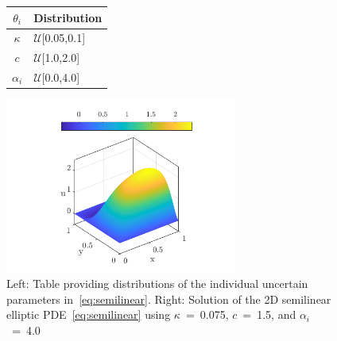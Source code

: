 \begin{figure}[htbp]
\begin{center}
\begin{minipage}[htbp]{.25\linewidth}
\vspace{0pt}
\hspace{-25mm}
\begin{tabular}{cl}
\toprule
$\theta_i$ & \textbf{Distribution} \\ 
\bottomrule
$\kappa$ & $\mathcal{U}$[0.05,0.1] \\
$c$ & $\mathcal{U}$[1.0,2.0] \\
$\alpha_i$ & $\mathcal{U}$[0.0,4.0] \\
\bottomrule
\end{tabular}
\end{minipage}
\hspace{-20mm}
\begin{minipage}[htbp]{.25\linewidth}
\vspace{0pt}
\includegraphics[width=3.0in]{./Figures/u_soln.png}
\end{minipage}%
\end{center} 
\caption{Left: Table providing distributions of the individual
uncertain parameters in~\eqref{eq:semilinear}. Right: Solution
of the 2D semilinear elliptic PDE~\eqref{eq:semilinear} using
$\kappa$~=~0.075, $c$~=~1.5, and $\alpha_i$~=~4.0}
\label{fig:elliptic}
\end{figure}


%


